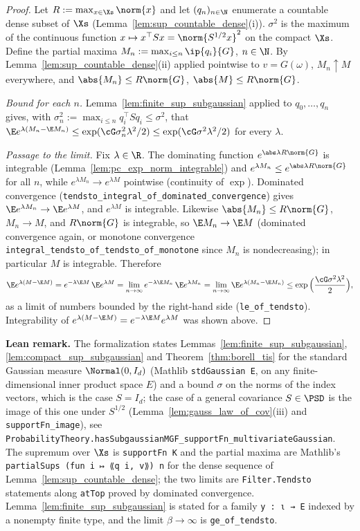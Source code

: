 \begin{proof}
\leanok
{}
Let $R := \max_{x\in\Xs}\norm{x}$ and let $(q_n)_{n\in\N}$ enumerate a countable dense subset
of $\Xs$ (Lemma~\ref{lem:sup_countable_dense}(i)). $\sigma^2$ is the maximum of the continuous
function $x\mapsto x^\top Sx = \norm{S^{1/2}x}^2$ on the compact $\Xs$. Define the partial
maxima $M_n := \max_{i\le n}\ip{q_i}{G}$, $n \in \N$. By Lemma~\ref{lem:sup_countable_dense}(ii)
applied pointwise to $v = G(\omega)$, $M_n \uparrow M$ everywhere, and
$\abs{M_n} \le R\norm{G}$, $\abs{M} \le R\norm{G}$.

\emph{Bound for each $n$.} Lemma~\ref{lem:finite_sup_subgaussian} applied to $q_0,\dots,q_n$
gives, with $\sigma_n^2 := \max_{i\le n}q_i^\top Sq_i \le \sigma^2$, that
$\E e^{\lambda(M_n - \E M_n)} \le \exp(\cG\sigma_n^2\lambda^2/2) \le \exp(\cG\sigma^2\lambda^2/2)$
for every $\lambda$.

\emph{Passage to the limit.} Fix $\lambda\in\R$. The dominating function
$e^{\abs\lambda R\norm{G}}$ is integrable (Lemma~\ref{lem:pc_exp_norm_integrable}) and
$e^{\lambda M_n} \le e^{\abs\lambda R\norm{G}}$ for all $n$, while $e^{\lambda M_n} \to e^{\lambda M}$
pointwise (continuity of $\exp$). Dominated convergence
(\texttt{tendsto\_integral\_of\_dominated\_convergence}) gives
$\E e^{\lambda M_n} \to \E e^{\lambda M}$, and $e^{\lambda M}$ is integrable. Likewise
$\abs{M_n} \le R\norm{G}$, $M_n \to M$, and $R\norm{G}$ is integrable, so
$\E M_n \to \E M$ (dominated convergence again, or monotone convergence
\texttt{integral\_tendsto\_of\_tendsto\_of\_monotone} since $M_n$ is nondecreasing); in
particular $M$ is integrable. Therefore
\[
  \E e^{\lambda(M - \E M)} = e^{-\lambda\E M}\,\E e^{\lambda M}
  = \lim_{n\to\infty}e^{-\lambda\E M_n}\,\E e^{\lambda M_n}
  = \lim_{n\to\infty}\E e^{\lambda(M_n - \E M_n)} \le \exp\Big(\frac{\cG\sigma^2\lambda^2}{2}\Big),
\]
as a limit of numbers bounded by the right-hand side (\texttt{le\_of\_tendsto}). Integrability
of $e^{\lambda(M-\E M)} = e^{-\lambda\E M}e^{\lambda M}$ was shown above.
\end{proof}

\textbf{Lean remark.} The formalization states Lemmas~\ref{lem:finite_sup_subgaussian},
\ref{lem:compact_sup_subgaussian} and Theorem~\ref{thm:borell_tis} for the standard Gaussian
measure $\Normal(0, I_d)$ (Mathlib \texttt{stdGaussian E}, on any finite-dimensional inner
product space $E$) and a bound $\sigma$ on the norms of the index vectors, which is the case
$S = I_d$; the case of a general covariance $S \in \PSD$ is the image of this one under
$S^{1/2}$ (Lemma~\ref{lem:gauss_law_of_cov}(iii) and \texttt{supportFn\_image}), see
\texttt{ProbabilityTheory.hasSubgaussianMGF\_supportFn\_multivariateGaussian}. The supremum
over $\Xs$ is \texttt{supportFn K} and the partial maxima are Mathlib's
\texttt{partialSups (fun i ↦ ⟪q i, v⟫) n} for the dense sequence of
Lemma~\ref{lem:sup_countable_dense}; the two limits are \texttt{Filter.Tendsto} statements
along \texttt{atTop} proved by dominated convergence. Lemma~\ref{lem:finite_sup_subgaussian}
is stated for a family \texttt{y : ι → E} indexed by a nonempty finite type, and the limit
$\beta \to \infty$ is \texttt{ge\_of\_tendsto}.


